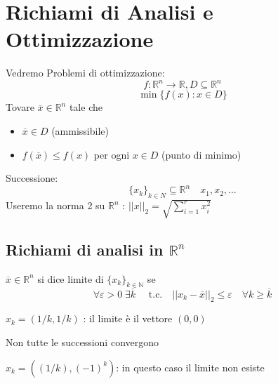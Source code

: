 


\inbpdocument 

\chapter{Richiami di Analisi e Ottimizzazione}
Vedremo Problemi di ottimizzazione:
 $$ f: \mathbb{R}^{n} \rightarrow \mathbb{R}, D \subseteq \mathbb{R}^{n}$$
  $$ \min \{ f(x) : x \in D \}$$
 Tovare $\overline{x} \in \mathbb{R}^{n}$ tale che
\begin{itemize}
 \item  $\overline{x} \in D$ (ammissibile)
 \item $f(\overline{x}) \leq f(x)$ per ogni $x \in D$ (punto di minimo)
\end{itemize}
Successione:
$$\{x_k\}_{k \in N} \subseteq \mathbb{R}^{n} \quad x_1,x_2,\ldots$$
Useremo la norma 2 su 
$\mathbb{R}^n$ :  $|| x ||_{2} = \sqrt{\displaystyle \sum_{i=1}^{r}x_{i}^2}$
\section{Richiami di analisi in $\mathbb{R}^{n}$}
\begin{defn}
 $\overline{x} \in \mathbb{R}^n$ si dice limite di $\{ x_k \}_{k \in \mathbb{N}}$ 
se 
$$ \forall \varepsilon > 0 \; \exists  \overline{k} \quad \text{ t.c.} \quad  || x_k - \overline{x} ||_{2} \leq \varepsilon 
 \quad \forall k \geq \overline{k}$$
\end{defn}

\begin{example}
 $x_k = (1/k, 1/k)$ : il limite è il vettore $(0,0)$
\end{example}
Non tutte le successioni convergono
\begin{example}
 $x_k = ((1/k), (-1)^{k}) $: in questo caso il limite non esiste
\end{example}


